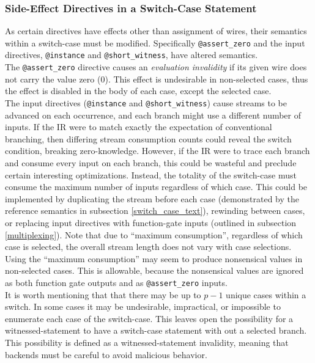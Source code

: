 \subsubsection*{Side-Effect Directives in a Switch-Case Statement}\label{switch_side_effects_overview}
As certain directives have effects other than assignment of wires, their semantics within a switch-case must be modified.
Specifically \texttt{@assert\_zero} and the input directives, \texttt{@instance} and \texttt{@short\_witness}, have altered semantics.\\

The \texttt{@assert\_zero} directive causes an \textit{evaluation invalidity} if its given wire does not carry the value zero (0).
This effect is undesirable in non-selected cases, thus the effect is disabled in the body of each case, except the selected case. \\

The input directives (\texttt{@instance} and \texttt{@short\_witness}) cause streams to be advanced on each occurrence, and each branch might use a different number of inputs.
If the IR were to match exactly the expectation of conventional branching, then differing stream consumption counts could reveal the switch condition, breaking zero-knowledge.
However, if the IR were to trace each branch and consume every input on each branch, this could be wasteful and preclude certain interesting optimizations.
Instead, the totality of the switch-case must consume the maximum number of inputs regardless of which case.
This could be implemented by duplicating the stream before each case (demonstrated by the reference semantics in subsection \ref{switch_case_text}), rewinding between cases, or replacing input directives with function-gate inputs (outlined in subsection \ref{multiplexing}).
Note that due to ``maximum consumption'', regardless of which case is selected, the overall stream length does not vary with case selections.\\

Using the ``maximum consumption'' may seem to produce nonsensical values in non-selected cases.
This is allowable, because the nonsensical values are ignored as both function gate outputs and as \texttt{@assert\_zero} inputs.\\

It is worth mentioning that that there may be up to $p-1$ unique cases within a switch.
In some cases it may be undesirable, impractical, or impossible to enumerate each case of the switch-case.
This leaves open the possibility for a witnessed-statement to have a switch-case statement with out a selected branch.
This possibility is defined as a witnessed-statement invalidity, meaning that backends must be careful to avoid malicious behavior.\\

